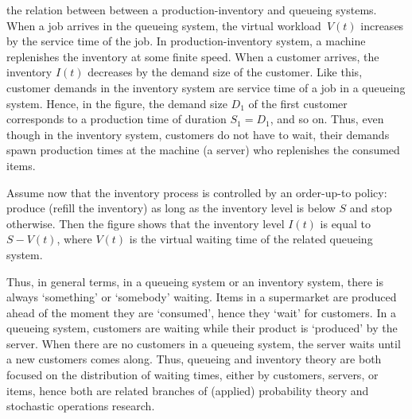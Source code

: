 \documentclass[queueing-book.tex]{subfiles}
\begin{document}
  the relation between between a pro\-duc\-tion-inventory and queueing systems.
When a job arrives in the queueing system, the virtual workload~$V(t)$ increases by the service time of the job.
In production-inventory system, a machine replenishes the inventory at some finite speed.
When a customer arrives, the inventory $I(t)$ decreases by the demand size of the customer.
Like this, customer demands in the inventory system are service time of a job in a queueing system.
Hence, in the figure, the demand size $D_1$ of the first customer corresponds to a production time of duration $S_1=D_1$, and so on.
Thus, even though in the inventory system, customers do not have to wait, their demands spawn production times at the machine (a server) who replenishes the consumed items.

Assume now that the inventory process is controlled by an order-up-to policy: produce (refill the inventory) as long as the inventory level is below $S$ and stop otherwise.
Then the figure shows that the inventory level $I(t)$ is equal to $S-V(t)$, where $V(t)$ is the virtual waiting time of the related queueing system.

Thus, in general terms, in a queueing system or an inventory system, there is always `something' or `somebody' waiting.
Items in a supermarket are produced ahead of the moment they are `consumed', hence they `wait' for customers.
In a queueing system, customers are waiting while their product is `produced' by the server.
When there are no customers in a queueing system, the server waits until a new customers comes along.
Thus, queueing and inventory theory are both focused on the distribution of waiting times, either by customers, servers, or items, hence both are related branches of (applied) probability theory and stochastic operations research.
\end{document}
